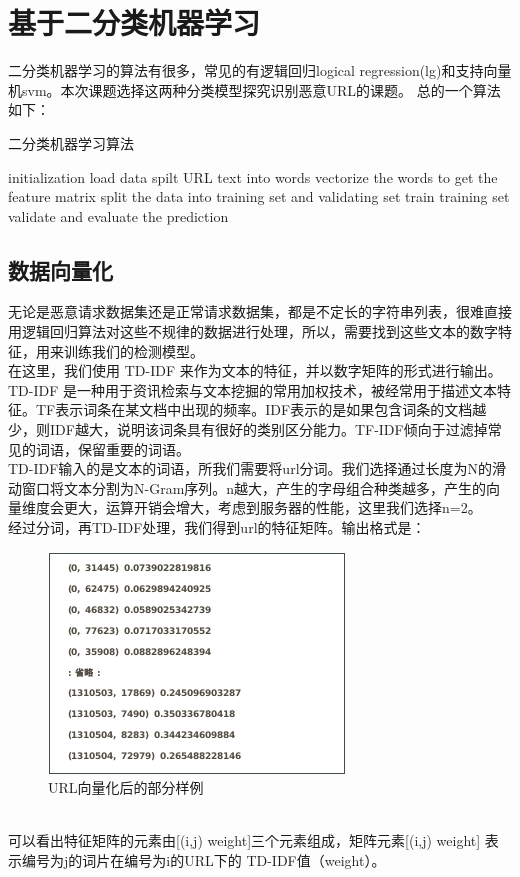 \section{基于二分类机器学习}
二分类机器学习的算法有很多，常见的有逻辑回归logical regression(lg)和支持向量机svm。本次课题选择这两种分类模型探究识别恶意URL的课题。
总的一个算法如下：
\begin{algorithm}[!h]
    \SetAlgoNoLine
    \caption{二分类机器学习算法}
    initialization\;
    load data\;
    spilt URL text into words\;
    vectorize the words to get the feature matrix\;
    split the data into training set and validating set\;
    train training set\;
    validate and evaluate the prediction\;
    
\end{algorithm}
\subsection{数据向量化}
无论是恶意请求数据集还是正常请求数据集，都是不定长的字符串列表，很难直接用逻辑回归算法对这些不规律的数据进行处理，所以，需要找到这些文本的数字特征，用来训练我们的检测模型。
\\\indent{}在这里，我们使用 TD-IDF 来作为文本的特征，并以数字矩阵的形式进行输出。TD-IDF 是一种用于资讯检索与文本挖掘的常用加权技术，被经常用于描述文本特征。TF表示词条在某文档中出现的频率。IDF表示的是如果包含词条的文档越少，则IDF越大，说明该词条具有很好的类别区分能力。TF-IDF倾向于过滤掉常见的词语，保留重要的词语。
\\\indent{}TD-IDF输入的是文本的词语，所我们需要将url分词。我们选择通过长度为N的滑动窗口将文本分割为N-Gram序列。n越大，产生的字母组合种类越多，产生的向量维度会更大，运算开销会增大，考虑到服务器的性能，这里我们选择n=2。
\\\indent{}经过分词，再TD-IDF处理，我们得到url的特征矩阵。输出格式是：
\begin{figure}[!h]
    \centering
     \includegraphics[scale=0.55]{Figs/vec.png}
    \caption{URL向量化后的部分样例}
    \label{fig:vec}
\end{figure}
\\\indent{}可以看出特征矩阵的元素由[(i,j) weight]三个元素组成，矩阵元素[(i,j) weight] 表示编号为j的词片在编号为i的URL下的 TD-IDF值（weight）。
